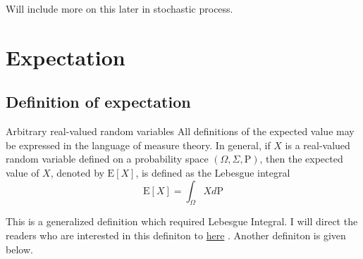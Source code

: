 \documentclass[11pt]{elegantbook}
\begin{document}
\begin{note}
    Will include more on this later in stochastic process.
\end{note}
\chapter{Expectation}
\section{Definition of expectation}
\begin{definition}{Arbitrary real-valued random variables}
    All definitions of the expected value may be expressed in the language of measure theory. In general, if $X$ is a real-valued random variable defined on a probability space $(\Omega, \Sigma, \mathrm{P})$, then the expected value of $X$, denoted by $\mathrm{E}[X]$, is defined as the Lebesgue integral
$$
\mathrm{E}[X]=\int_{\Omega} X d \mathrm{P}
$$
\end{definition}

\begin{note}
    This is a generalized definition which required Lebesgue Integral. I will direct the readers who are interested in this definiton to \href{https://en.wikipedia.org/wiki/Expected_value#Arbitrary_real-valued_random_variables}{here} .  Another definiton is given below.
\end{note}
\end{document}
